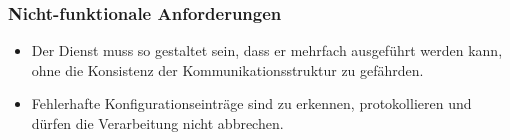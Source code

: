 \subsubsection{Nicht-funktionale Anforderungen}
\begin{itemize}
  \item Der Dienst muss so gestaltet sein, dass er mehrfach ausgeführt werden kann, ohne die Konsistenz der Kommunikationsstruktur zu gefährden.
  \item Fehlerhafte Konfigurationseinträge sind zu erkennen, protokollieren und dürfen die Verarbeitung nicht abbrechen.
\end{itemize}
